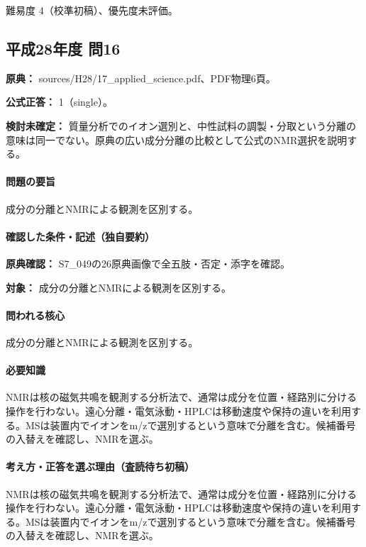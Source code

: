 \par 難易度 4（校準初稿）、優先度未評価。

\subsection{平成28年度 問16}
\label{q:h28-reg-applied-16}

\noindent\textbf{原典：} sources/H28/17\_applied\_science.pdf、PDF物理6頁。

\textbf{公式正答：} 1（single）。

\par\textbf{検討未確定：} 質量分析でのイオン選別と、中性試料の調製・分取という分離の意味は同一でない。原典の広い成分分離の比較として公式のNMR選択を説明する。

\paragraph{問題の要旨} 成分の分離とNMRによる観測を区別する。

\paragraph{確認した条件・記述（独自要約）}\mbox{}\par

\noindent\textbf{原典確認：} S7\_049の26原典画像で全五肢・否定・添字を確認。\par

\noindent\textbf{対象：} 成分の分離とNMRによる観測を区別する。\par

\paragraph{問われる核心} 成分の分離とNMRによる観測を区別する。

\paragraph{必要知識} NMRは核の磁気共鳴を観測する分析法で、通常は成分を位置・経路別に分ける操作を行わない。遠心分離・電気泳動・HPLCは移動速度や保持の違いを利用する。MSは装置内でイオンをm/zで選別するという意味で分離を含む。候補番号の入替えを確認し、NMRを選ぶ。

\paragraph{考え方・正答を選ぶ理由（査読待ち初稿）} NMRは核の磁気共鳴を観測する分析法で、通常は成分を位置・経路別に分ける操作を行わない。遠心分離・電気泳動・HPLCは移動速度や保持の違いを利用する。MSは装置内でイオンをm/zで選別するという意味で分離を含む。候補番号の入替えを確認し、NMRを選ぶ。

